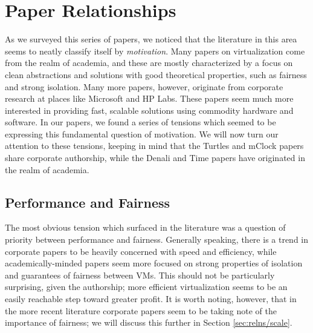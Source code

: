 \documentclass[letterpaper, twocolumn]{article}
\begin{document}
\section{Paper Relationships}
\label{sec:relns}

As we surveyed this series of papers, we noticed that the literature
in this area seems to neatly classify itself by \emph{motivation}.
Many papers on virtualization come from the realm of academia, and these
are mostly characterized by a focus on clean abstractions and solutions
with good theoretical properties, such as fairness and strong isolation.
Many more papers, however, originate from corporate research at places
like Microsoft and HP Labs.  These papers seem much more interested
in providing fast, scalable solutions using commodity hardware and
software.  In our papers, we found a series of tensions which seemed
to be expressing this fundamental question of motivation.  We will
now turn our attention to these tensions, keeping in mind that the
Turtles and mClock papers share corporate authorship, while the
Denali and Time papers have originated in the realm of academia.

\subsection{Performance and Fairness}
\label{sec:relns/perf-fair}

The most obvious tension which surfaced in the literature was a question
of priority between performance and fairness.  Generally speaking, there is a trend
in corporate papers to be heavily concerned with speed and efficiency, while
academically-minded papers seem more focused on strong properties of isolation
and guarantees of fairness between VMs.  This should not be particularly surprising,
given the authorship; more efficient virtualization seems to be an easily reachable
step toward greater profit.  It is worth noting, however, that in the more recent
literature corporate papers seem to be taking note of the importance of fairness;
we will discuss this further in Section \ref{sec:relns/scale}.
\end{document}
